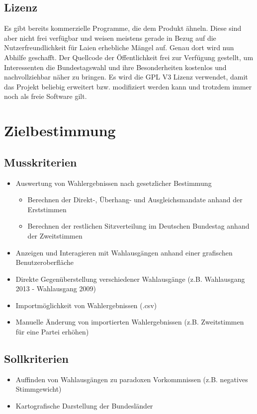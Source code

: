 \documentclass[10pt,a4paper]{article}
\begin{document}
\subsection{Lizenz}
Es gibt bereits kommerzielle Programme, die dem Produkt ähneln. Diese sind aber nicht frei verfügbar und weisen meistens gerade in Bezug auf die Nutzerfreundlichkeit für Laien erhebliche Mängel auf. Genau dort wird nun Abhilfe geschafft.\newline
Der Quellcode der Öffentlichkeit frei zur Verfügung gestellt, um Interessenten die Bundestagswahl und ihre Besonderheiten kostenlos und nachvollziehbar näher zu bringen. Es wird die GPL V3 Lizenz verwendet, damit das Projekt beliebig erweitert bzw. modifiziert werden kann und trotzdem immer noch als freie Software gilt.



\section{Zielbestimmung}
\subsection{Musskriterien}
\begin{itemize}
\item Auswertung von Wahlergebnissen nach gesetzlicher Bestimmung
\begin{itemize}
\item Berechnen der Direkt-, Überhang- und Ausgleichsmandate anhand der Erststimmen
\item Berechnen der restlichen Sitzverteilung im Deutschen Bundestag anhand der Zweitstimmen
\end{itemize}
\item Anzeigen und Interagieren mit Wahlausgängen anhand einer grafischen Benutzeroberfläche
\item Direkte Gegenüberstellung verschiedener Wahlausgänge (z.B. Wahlausgang 2013 - Wahlausgang 2009)
\item Importmöglichkeit von Wahlergebnissen (.csv)
\item Manuelle Änderung von importierten Wahlergebnissen (z.B. Zweitstimmen für eine Partei erhöhen)
\end{itemize}

\subsection{Sollkriterien}
\begin{itemize}
\item Auffinden von Wahlausgängen zu paradoxen Vorkommnissen (z.B. negatives Stimmgewicht)
\item Kartografische Darstellung der Bundesländer
\end{itemize}
\end{document}
